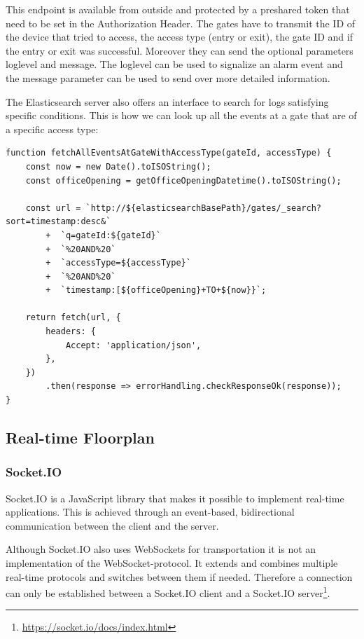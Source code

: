 This endpoint is available from outside and protected by a preshared token that need to be set in the Authorization Header. The gates have to transmit the ID of the device that tried to access, the access type (entry or exit), the gate ID and if the entry or exit was successful. Moreover they can send the optional parameters loglevel and message. The loglevel can be used to signalize an alarm event and the message parameter can be used to send over more detailed information.

The Elasticsearch server also offers an interface to search for logs satisfying specific conditions. This is how we can look up all the events at a gate that are of a specific access type:

\begin{lstlisting}[label=searchElasticGET]
function fetchAllEventsAtGateWithAccessType(gateId, accessType) {
    const now = new Date().toISOString();
    const officeOpening = getOfficeOpeningDatetime().toISOString();

    const url = `http://${elasticsearchBasePath}/gates/_search?sort=timestamp:desc&`
        +  `q=gateId:${gateId}`
        +  `%20AND%20`
        +  `accessType=${accessType}`
        +  `%20AND%20`
        +  `timestamp:[${officeOpening}+TO+${now}}`;
        
    return fetch(url, {
        headers: {
            Accept: 'application/json',
        },
    })
        .then(response => errorHandling.checkResponseOk(response));
}
\end{lstlisting}

\subsection{Real-time Floorplan}
\label{Real-time Floorplan}

\subsubsection{Socket.IO}
\label{Socket.IO}

Socket.IO is a JavaScript library that makes it possible to implement real-time applications. This is achieved through an event-based, bidirectional communication between the client and the server. 

Although Socket.IO also uses WebSockets for transportation it is not an implementation of the WebSocket-protocol. It extends and combines multiple real-time protocols and switches between them if needed. Therefore a connection can only be established between a Socket.IO client and a Socket.IO server\footnote{\url{https://socket.io/docs/index.html}}.

